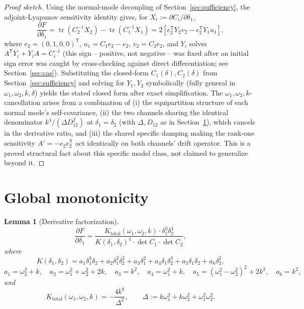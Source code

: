 \documentclass[11pt]{article}
\newtheorem{lemma}{Lemma}
\theoremstyle{definition}
\newcommand{\dd}[2]{\frac{\partial #1}{\partial #2}}
\begin{document}
\begin{proof}[Proof sketch]
Using the normal-mode decoupling of Section~\ref{sec:sufficiency}, the
adjoint-Lyapunov sensitivity identity gives, for $X_i:=\partial
C_i/\partial\delta_1$,
\[
\dd{F}{\delta_1} = \operatorname{tr}(C_2^{-1}X_2)-\operatorname{tr}(C_1^{-1}X_1)
 = 2\left[e_2^{\mathsf T}Y_2v_2 - e_2^{\mathsf T}Y_1u_1\right],
\]
where $e_2=(0,1,0,0)^{\mathsf T}$, $u_1=C_1e_2-e_2$, $v_2=C_2e_2$, and
$Y_i$ solves $A^{\mathsf T}Y_i+Y_iA=C_i^{-1}$ (this sign -- positive, not
negative -- was fixed after an initial sign error was caught by
cross-checking against direct differentiation; see
Section~\ref{sec:cas}). Substituting the closed-form $C_1(\delta),
C_2(\delta)$ from Section~\ref{sec:sufficiency} and solving for $Y_1,Y_2$
symbolically (fully general in $\omega_1,\omega_2,k,\delta$) yields the
stated closed form after exact simplification. The
$\omega_1,\omega_2,k$-cancellation arises from a combination of (i) the
equipartition structure of each normal mode's self-covariance, (ii) the
two channels sharing the identical denominator
$k^4/(\Delta D_{12}^2)$ at $\delta_1=\delta_2$ (with $\Delta,D_{12}$ as
in Section~\ref{sec:factorization}), which cancels in the derivative
ratio, and (iii) the shared specific damping making the rank-one
sensitivity $A'=-e_2e_2^{\mathsf T}$ act identically on both channels'
drift operator. This is a proved structural fact about this specific
model class, not claimed to generalize beyond it.
\end{proof}

\section{Global monotonicity}
\label{sec:factorization}

\begin{lemma}[Derivative factorization]
\label{lem:factorization}
\[
\dd{F}{\delta_1} = \frac{K_{\mathrm{total}}(\omega_1,\omega_2,k)\cdot
\delta_1^3\delta_2^4}{K(\delta_1,\delta_2)^4\cdot\det C_1\cdot\det C_2},
\]
where
\[
K(\delta_1,\delta_2) = a_1\delta_1^3\delta_2+a_2\delta_1^2\delta_2^2
+a_3\delta_1^2+a_4\delta_1\delta_2^3+a_5\delta_1\delta_2+a_6\delta_2^2,
\]
\[
a_1=\omega_2^2+k,\quad a_2=\omega_1^2+\omega_2^2+2k,\quad a_3=k^2,\quad
a_4=\omega_1^2+k,\quad a_5=(\omega_1^2-\omega_2^2)^2+2k^2,\quad a_6=k^2,
\]
and
\[
K_{\mathrm{total}}(\omega_1,\omega_2,k) = -\frac{4k^8}{\Delta^2},
\qquad
\Delta := k\omega_1^2+k\omega_2^2+\omega_1^2\omega_2^2.
\]
\end{lemma}
\end{document}

